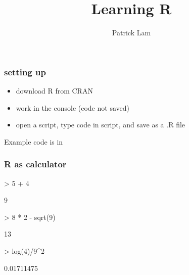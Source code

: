 \documentclass[handout]{beamer}
\title{Learning R}
\author{Patrick Lam}
\date{}
\newcommand{\red}{\color{red}}
\begin{document}
\maketitle


\begin{frame}
\frametitle{setting up}
\pause
\begin{itemize}
\item download R from CRAN
\item work in the console (code not saved)
\item open a script, type code in script, and save as a .R file
\end{itemize}
\end{frame}

\begin{frame}
\begin{center}
Example code is in \red{red}
\end{center}
\end{frame}

\begin{frame}[fragile]
\frametitle{R as calculator}
\pause
\red
\begin{Schunk}
\begin{Sinput}
> 5 + 4
\end{Sinput}
\begin{Soutput}
[1] 9
\end{Soutput}
\end{Schunk}
\pause
\bigskip 
\begin{Schunk}
\begin{Sinput}
> 8 * 2 - sqrt(9)
\end{Sinput}
\begin{Soutput}
[1] 13
\end{Soutput}
\end{Schunk}
\pause
\bigskip
\begin{Schunk}
\begin{Sinput}
> log(4)/9^2
\end{Sinput}
\begin{Soutput}
[1] 0.01711475
\end{Soutput}
\end{Schunk}
\end{frame}
\end{document}
